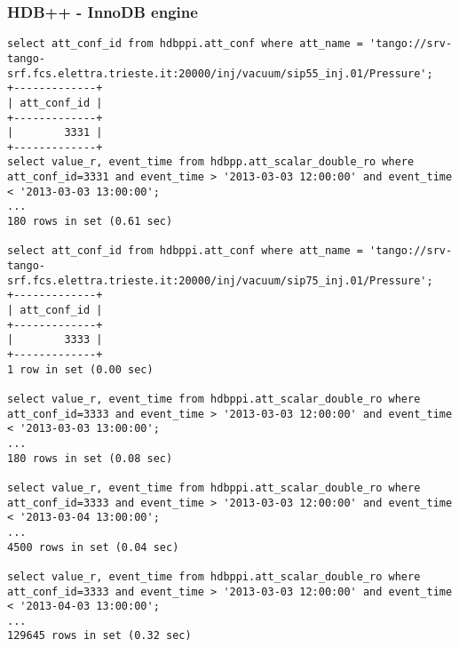 \documentclass[11pt,a4paper]{article}
\def \hdb{HDB++}
\begin{document}
\subsubsection{\hdb{} - InnoDB engine}
\begin{lstlisting}
select att_conf_id from hdbppi.att_conf where att_name = 'tango://srv-tango-srf.fcs.elettra.trieste.it:20000/inj/vacuum/sip55_inj.01/Pressure';
+-------------+
| att_conf_id |
+-------------+
|        3331 |
+-------------+
select value_r, event_time from hdbpp.att_scalar_double_ro where att_conf_id=3331 and event_time > '2013-03-03 12:00:00' and event_time < '2013-03-03 13:00:00';
...
180 rows in set (0.61 sec)

select att_conf_id from hdbppi.att_conf where att_name = 'tango://srv-tango-srf.fcs.elettra.trieste.it:20000/inj/vacuum/sip75_inj.01/Pressure';
+-------------+
| att_conf_id |
+-------------+
|        3333 |
+-------------+
1 row in set (0.00 sec)

select value_r, event_time from hdbppi.att_scalar_double_ro where att_conf_id=3333 and event_time > '2013-03-03 12:00:00' and event_time < '2013-03-03 13:00:00';
...
180 rows in set (0.08 sec)

select value_r, event_time from hdbppi.att_scalar_double_ro where att_conf_id=3333 and event_time > '2013-03-03 12:00:00' and event_time < '2013-03-04 13:00:00';
...
4500 rows in set (0.04 sec)

select value_r, event_time from hdbppi.att_scalar_double_ro where att_conf_id=3333 and event_time > '2013-03-03 12:00:00' and event_time < '2013-04-03 13:00:00';
...
129645 rows in set (0.32 sec)
\end{lstlisting}

\newpage{\clearpage}
\end{document}

